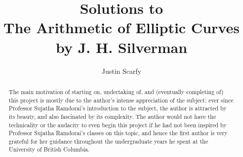 \documentclass[12pt,reqno]{amsart}
\begin{document}
\thispagestyle{empty}

\parindent=0pt
\parskip=4pt

\renewcommand{\labelenumi}{(\alph{enumi})}
\renewcommand{\theenumi}{(\alph{enumi})}

\newcommand{\legendre}[2]{\genfrac{(}{)}{}{}{#1}{#2}}
\newcommand{\li}{\mathop{\rm li}}
\renewcommand{\pmod}[1]{{\ifmmode\text{\rm\ (mod~$#1$)}\else\discretionary{}{}{\hbox{ }}\rm(mod~$#1$)\fi}}
\newcommand{\ord}{{\operatorname{ord}}}
\newcommand{\Div}{{\operatorname{Div}}}
\newcommand{\Pic}{{\operatorname{Pic}}}
\newcommand{\genus}{{\operatorname{genus}}}
\newcommand{\divop}{{\operatorname{div}}}
\newcommand{\GL}{{\operatorname{GL}}}
\newcommand{\charop}{{\operatorname{char}}}
\newcommand{\Aut}{{\operatorname{Aut}}}
\newcommand{\Hom}{{\operatorname{Hom}}}
\newcommand{\End}{{\operatorname{End}}}
\newcommand{\Br}{{\operatorname{Br}}}


\newcommand{\C}{{\mathbb C}}
\newcommand{\N}{{\mathbb N}}
\newcommand{\R}{{\mathbb R}}
\newcommand{\Z}{{\mathbb Z}}
\newcommand{\A}{{\mathbb A}}
\newcommand{\F}{{\mathbb F}}
\newcommand{\Q}{{\mathbb Q}}
\newcommand{\PP}{{\mathbb P}}


\newtheorem{theorem}{Theorem}[section]
\newtheorem{lem}[theorem]{Lemma}
\newtheorem{cor}[theorem]{Corollary}
\newtheorem{cnj}[theorem]{Conjecture}
\newtheorem{dfn}[theorem]{Definition}
\newtheorem{rmk}[theorem]{Remark}
\newtheorem{xmp}[theorem]{Example}
\newtheorem{exe}[theorem]{Exercise}

\newenvironment{solution}
               {\let\oldqedsymbol=\qedsymbol
                \renewcommand{\qedsymbol}{$\blacktriangle$}
                \begin{proof}[\upshape Solution]}
               {\end{proof}
                \renewcommand{\qedsymbol}{\oldqedsymbol}}


\title{\bf Solutions to \\ The Arithmetic of Elliptic Curves\\ by J. H. Silverman}

\author{Justin Scarfy}
\begin{abstract}
The main motivation of starting on, undertaking of, and (eventually completing of) this project is mostly due to the author's intense appreciation of the subject: ever since Professor Sujatha Ramdorai's introduction to the subject, the author is attracted by its beauty, and also fascinated by its complexity.  The author would not have the technicality or the audacity to even begin this project if he had not been inspired by Professor Sujatha Ramdorai's classes on this topic, and hence the first author is very grateful for her guidance throughout the undergraduate years he spent at the University of British Columbia.  
\end{abstract}
\maketitle
\end{document}
